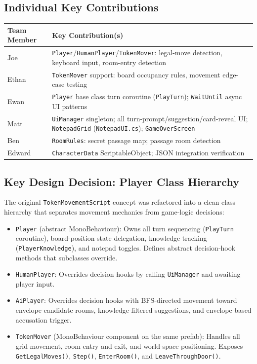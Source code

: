 \subsection*{Individual Key Contributions}
\begin{table}[H]
\centering
\footnotesize
\begin{tabular}{|p{1.8cm}|p{7.2cm}|}
\hline
\textbf{Team Member} & \textbf{Key Contribution(s)} \\ \hline
Joe & \texttt{Player}/\texttt{HumanPlayer}/\texttt{TokenMover}: legal-move detection, keyboard input, room-entry detection \\ \hline
Ethan & \texttt{TokenMover} support: board occupancy rules, movement edge-case testing \\ \hline
Ewan & \texttt{Player} base class turn coroutine (\texttt{PlayTurn}); \texttt{WaitUntil} async UI patterns \\ \hline
Matt & \texttt{UiManager} singleton; all turn-prompt/suggestion/card-reveal UI; \texttt{NotepadGrid} (\texttt{NotepadUI.cs}); \texttt{GameOverScreen} \\ \hline
Ben & \texttt{RoomRules}: secret passage map; passage room detection \\ \hline
Edward & \texttt{CharacterData} ScriptableObject; JSON integration verification \\ \hline
\end{tabular}
\end{table}

\subsection*{Key Design Decision: Player Class Hierarchy}

The original \texttt{TokenMovementScript} concept was refactored into a clean class hierarchy that separates movement mechanics from game-logic decisions:

\begin{itemize}
    \item \texttt{Player} (abstract MonoBehaviour): Owns all turn sequencing (\texttt{PlayTurn} coroutine), board-position state delegation, knowledge tracking (\texttt{PlayerKnowledge}), and notepad toggles. Defines abstract decision-hook methods that subclasses override.
    \item \texttt{HumanPlayer}: Overrides decision hooks by calling \texttt{UiManager} and awaiting player input.
    \item \texttt{AiPlayer}: Overrides decision hooks with BFS-directed movement toward envelope-candidate rooms, knowledge-filtered suggestions, and envelope-based accusation trigger.
    \item \texttt{TokenMover} (MonoBehaviour component on the same prefab): Handles all grid movement, room entry and exit, and world-space positioning. Exposes \texttt{GetLegalMoves()}, \texttt{Step()}, \texttt{EnterRoom()}, and \texttt{LeaveThroughDoor()}.
\end{itemize}

